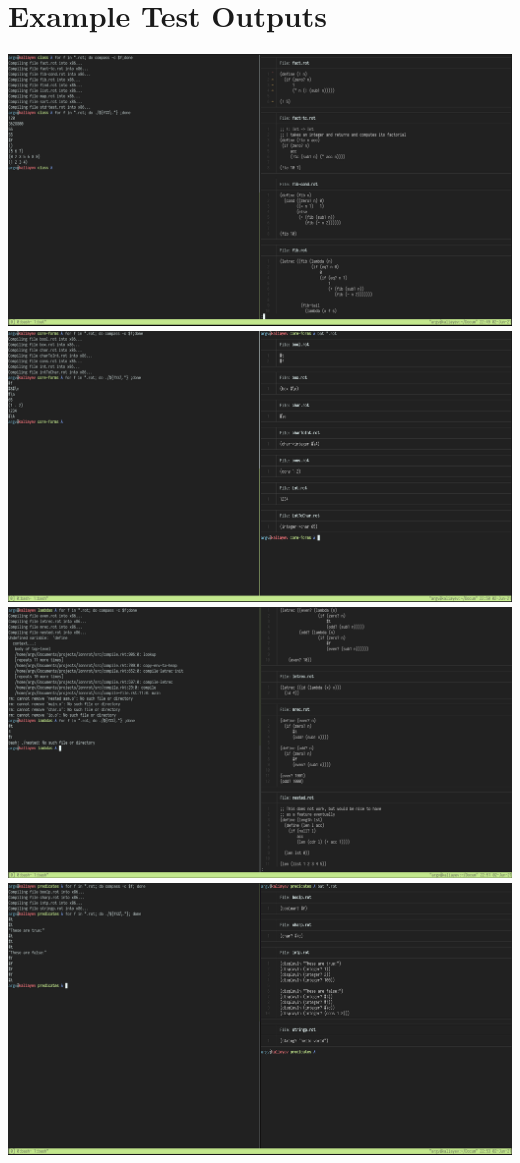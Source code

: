\section{Example Test Outputs}
\includegraphics[width=0.8\paperwidth]{figures/ch4/test-run-1}
\includegraphics[width=0.8\paperwidth]{figures/ch4/test-run-2}
\includegraphics[width=0.8\paperwidth]{figures/ch4/test-run-3}
\includegraphics[width=0.8\paperwidth]{figures/ch4/test-run-4}
